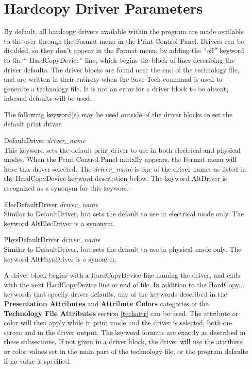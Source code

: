 \section{Hardcopy Driver Parameters}
By default, all hardcopy drivers available within the program are made
available to the user through the {\cb Format} menu in the {\cb Print
Control Panel}.  Drivers can be disabled, so they don't appear in the
{\cb Format} menu, by adding the ``{\vt off}'' keyword to the ``{\vt
HardCopyDevice}'' line, which begins the block of lines describing the
driver defaults.  The driver blocks are found near the end of the
technology file, and are written in their entirety when the {\cb Save
Tech} command is used to generate a technology file.  It is not an
error for a driver block to be absent; internal defaults will be used.

The following keyword(s) may be used outside of the driver blocks to
set the default print driver.

\begin{description}
\item{\vt DefaultDriver} {\it driver\_name}\\
This keyword sets the default print driver to use in both electrical
and physical modes.  When the {\cb Print Control Panel} initially
appears, the {\cb Format} menu will have this driver selected.  The
{\it driver\_name} is one of the driver names as listed in the {\vt
HardCopyDevice} keyword description below.  The keyword {\vt
AltDriver} is recognized as a synonym for this keyword.

\item{\vt ElecDefaultDriver} {\it driver\_name}\\
Similar to {\vt DefaultDriver}, but sets the default to use in
electrical mode only.  The keyword {\vt AltElecDriver} is a synonym.

\item{\vt PhysDefaultDriver} {\it driver\_name}\\
Similar to {\vt DefaultDriver}, but sets the default to use in
physical mode only.  The keyword {\vt AltPhysDriver} is a synonym.
\end{description}

A driver block begins with a {\vt HardCopyDevice} line naming the
driver, and ends with the next {\vt HardCopyDevice} line or end of
file.  In addition to the {\vt HardCopy...} keywords that specify
driver defaults, any of the keywords described in the {\bf
Presentation Attributes} and {\bf Attribute Colors} categories of the
{\bf Technology File Attributes} section \ref{techattr} can be used. 
The attribute or color will then apply while in print mode and the
driver is selected, both on-screen and in the driver output.  The
keyword formats are exactly as described in these subsections.  If not
given in a driver block, the driver will use the attribute or color
values set in the main part of the technology file, or the program
defaults if no value is specified.

